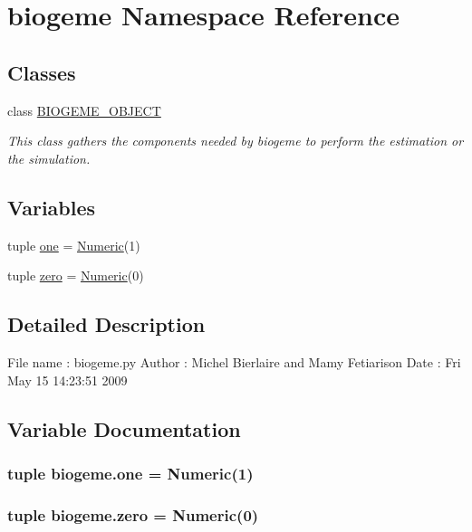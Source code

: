\hypertarget{namespacebiogeme}{\section{biogeme Namespace Reference}
\label{namespacebiogeme}
}
\subsection*{Classes}
\begin{DoxyCompactItemize}
\item 
class \hyperlink{classbiogeme_1_1_b_i_o_g_e_m_e___o_b_j_e_c_t}{B\+I\+O\+G\+E\+M\+E\+\_\+\+O\+B\+J\+E\+C\+T}
\begin{DoxyCompactList}\small\item\em This class gathers the components needed by biogeme to perform the estimation or the simulation. \end{DoxyCompactList}\end{DoxyCompactItemize}
\subsection*{Variables}
\begin{DoxyCompactItemize}
\item 
tuple \hyperlink{namespacebiogeme_a6b285a3c3429b46a91abb1e6813c4fe8}{one} = \hyperlink{classbio__expression_1_1_numeric}{Numeric}(1)
\item 
tuple \hyperlink{namespacebiogeme_a8904606e9284969aea5d936406022d23}{zero} = \hyperlink{classbio__expression_1_1_numeric}{Numeric}(0)
\end{DoxyCompactItemize}


\subsection{Detailed Description}
\begin{DoxyVerb}File name : biogeme.py
Author :    Michel Bierlaire and Mamy Fetiarison
Date :      Fri May 15 14:23:51 2009
\end{DoxyVerb}
 

\subsection{Variable Documentation}
\hypertarget{namespacebiogeme_a6b285a3c3429b46a91abb1e6813c4fe8}{
\subsubsection[{one}]{\setlength{\rightskip}{0pt plus 5cm}tuple biogeme.\+one = {\bf Numeric}(1)}}\label{namespacebiogeme_a6b285a3c3429b46a91abb1e6813c4fe8}
\hypertarget{namespacebiogeme_a8904606e9284969aea5d936406022d23}{
\subsubsection[{zero}]{\setlength{\rightskip}{0pt plus 5cm}tuple biogeme.\+zero = {\bf Numeric}(0)}}\label{namespacebiogeme_a8904606e9284969aea5d936406022d23}
